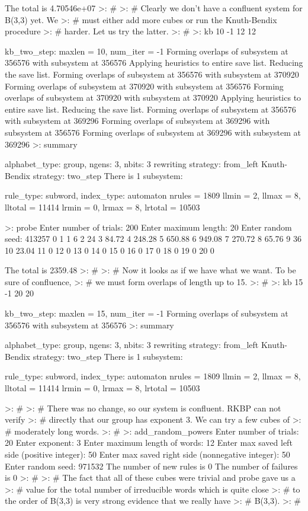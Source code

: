 {The total is 4.70546e+07
>: \#
>: \# Clearly we don't have a confluent system for B(3,3) yet.  We
>: \# must either add more cubes or run the Knuth-Bendix procedure
>: \# harder.  Let us try the latter.
>: \#
>: kb 10 -1 12 12

kb\_two\_step:  maxlen = 10, num\_iter = -1
Forming overlaps of subsystem at 356576 with subsystem at 356576
Applying heuristics to entire save list.
Reducing the save list.
Forming overlaps of subsystem at 356576 with subsystem at 370920
Forming overlaps of subsystem at 370920 with subsystem at 356576
Forming overlaps of subsystem at 370920 with subsystem at 370920
Applying heuristics to entire save list.
Reducing the save list.
Forming overlaps of subsystem at 356576 with subsystem at 369296
Forming overlaps of subsystem at 369296 with subsystem at 356576
Forming overlaps of subsystem at 369296 with subsystem at 369296
>: summary

alphabet\_type:  group,  ngens:  3,   nbits:  3
rewriting strategy:  from\_left
Knuth-Bendix strategy:  two\_step
There is 1 subsystem:

rule\_type:  subword,  index\_type:  automaton
nrules = 1809
llmin  = 2,  llmax = 8,  lltotal = 11414
lrmin  = 0,  lrmax = 8,  lrtotal = 10503

>: probe
Enter number of trials:  200
Enter maximum length:  20
Enter random seed:  413257
   0             1      1             6      2            24
   3         84.72      4        248.28      5        650.88
   6        949.08      7        270.72      8         65.76
   9            36     10         23.04     11             0
  12             0     13             0     14             0
  15             0     16             0     17             0
  18             0     19             0     20             0


The total is 2359.48
>: \#
>: \# Now it looks as if we have what we want.  To be sure of confluence,
>: \# we must form overlaps of length up to 15.
>: \#
>: kb 15 -1 20 20

kb\_two\_step:  maxlen = 15, num\_iter = -1
Forming overlaps of subsystem at 356576 with subsystem at 356576
>: summary

alphabet\_type:  group,  ngens:  3,   nbits:  3
rewriting strategy:  from\_left
Knuth-Bendix strategy:  two\_step
There is 1 subsystem:

rule\_type:  subword,  index\_type:  automaton
nrules = 1809
llmin  = 2,  llmax = 8,  lltotal = 11414
lrmin  = 0,  lrmax = 8,  lrtotal = 10503

>: \#
>: \# There was no change, so our system is confluent.  RKBP can not verify
>: \# directly that our group has exponent 3.  We can try a few cubes of
>: \# moderately long words.
>: \#
>: add\_random\_powers
Enter number of trials:  20
Enter exponent:  3
Enter maximum length of words:  12
Enter max saved left side (positive integer):  50
Enter max saved right side (nonnegative integer):  50
Enter random seed:  971532
The number of new rules is 0
The number of failures is 0
>: \#
>: \# The fact that all of these cubes were trivial and probe gave us a
>: \# value for the total number of irreducible words which is quite close
>: \# to the order of B(3,3) is very strong evidence that we really have
>: \# B(3,3).
>: \#
}


